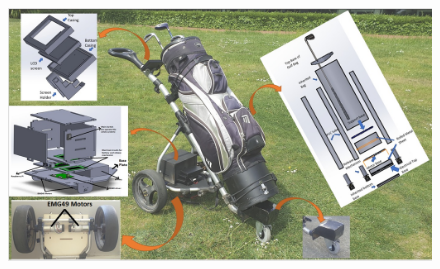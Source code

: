 \documentclass[11pt,landscape]{article}
\begin{document}
\begin{figure}[H]
    \begin{center}
        \includegraphics[width=\textwidth]{final_proposal.jpg}
    \end{center}
    \label{fig:final_proposal}
\end{figure}
\end{document}
